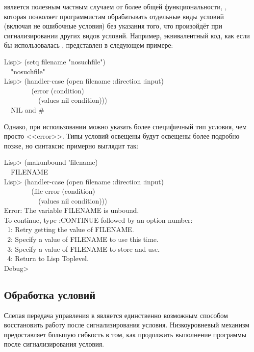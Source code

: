  является полезным частным случаем от более общей
функциональности, , которая позволяет программистам
обрабатывать отдельные виды условий (включая не ошибочные условия) без указания
того, что произойдёт при сигнализировании других видов условий. Например,
эквивалентный код, как если бы использовалась , представлен в
следующем примере:
\begin{lisp}
Lisp> (setq filename "nosuchfile") \\
~\EV\ "nosuchfile" \\
Lisp> (handler-case (open filename :direction :input) \\
~~~~~~~~(error (condition) \\
~~~~~~~~~~(values nil condition))) \\
~\EV\ NIL \textrm{and} \#<FILE-ERROR 3437525>
\end{lisp}
Однако, при использовании  можно указать более специфичный тип
условия, чем просто <<error>>. Типы условий освещены будут освещены более
подробно позже, но синтаксис примерно выглядит так:
\begin{lisp}
Lisp> (makunbound 'filename) \\
~\EV\ FILENAME \\
Lisp> (handler-case (open filename :direction :input) \\
~~~~~~~~(file-error (condition) \\
~~~~~~~~~~(values nil condition))) \\
Error: The variable FILENAME is unbound. \\
To continue, type :CONTINUE followed by an option number: \\
~1: Retry getting the value of FILENAME. \\
~2: Specify a value of FILENAME to use this time. \\
~3: Specify a value of FILENAME to store and use. \\
~4: Return to Lisp Toplevel. \\
Debug> 
\end{lisp}

\subsection{Обработка условий}
\label{HANDLING-CONDITIONS}

Слепая передача управления в  является единственно возможным
способом восстановить работу после сигнализирования условия. Низкоуровневый
механизм предоставляет большую гибкость в том, как продолжить выполнение
программы после сигнализирования условия.

